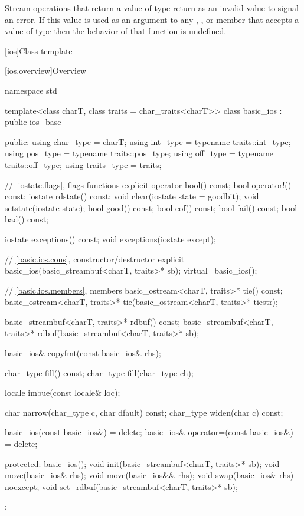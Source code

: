 \pnum
Stream operations that return a value of type
return
as an invalid value to signal an error.
If this value is used as an argument to any
,
,
or
 member
that accepts a value of type
then the behavior of that function is undefined.
%

[ios]{Class template }

[ios.overview]{Overview}

%
\begin{codeblock}
namespace std {
  template<class charT, class traits = char_traits<charT>>
  class basic_ios : public ios_base {
  public:
    using char_type   = charT;
    using int_type    = typename traits::int_type;
    using pos_type    = typename traits::pos_type;
    using off_type    = typename traits::off_type;
    using traits_type = traits;

    // \ref{iostate.flags}, flags functions
    explicit operator bool() const;
    bool operator!() const;
    iostate rdstate() const;
    void clear(iostate state = goodbit);
    void setstate(iostate state);
    bool good() const;
    bool eof()  const;
    bool fail() const;
    bool bad()  const;

    iostate exceptions() const;
    void exceptions(iostate except);

    // \ref{basic.ios.cons}, constructor/destructor
    explicit basic_ios(basic_streambuf<charT, traits>* sb);
    virtual ~basic_ios();

    // \ref{basic.ios.members}, members
    basic_ostream<charT, traits>* tie() const;
    basic_ostream<charT, traits>* tie(basic_ostream<charT, traits>* tiestr);

    basic_streambuf<charT, traits>* rdbuf() const;
    basic_streambuf<charT, traits>* rdbuf(basic_streambuf<charT, traits>* sb);

    basic_ios& copyfmt(const basic_ios& rhs);

    char_type fill() const;
    char_type fill(char_type ch);

    locale imbue(const locale& loc);

    char      narrow(char_type c, char dfault) const;
    char_type widen(char c) const;

    basic_ios(const basic_ios&) = delete;
    basic_ios& operator=(const basic_ios&) = delete;

  protected:
    basic_ios();
    void init(basic_streambuf<charT, traits>* sb);
    void move(basic_ios& rhs);
    void move(basic_ios&& rhs);
    void swap(basic_ios& rhs) noexcept;
    void set_rdbuf(basic_streambuf<charT, traits>* sb);

  };
}
\end{codeblock}

